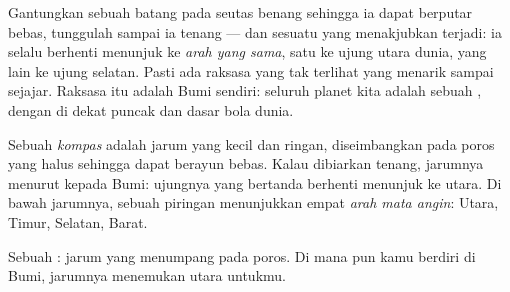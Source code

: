 \begin{example}\label{ex:g4:magnets-and-compass:earth}
Gantungkan sebuah  batang pada seutas benang sehingga ia dapat
berputar bebas, tunggulah sampai ia tenang --- dan sesuatu yang
menakjubkan terjadi: ia selalu berhenti menunjuk ke \emph{arah yang
sama}, satu  ke ujung utara dunia,  yang lain ke ujung
selatan. Pasti ada  raksasa yang tak terlihat yang menarik
 sampai sejajar. Raksasa itu adalah Bumi sendiri: seluruh
planet kita adalah sebuah , dengan   di dekat
puncak dan dasar bola dunia.
\end{example}

\begin{definition}[Kompas]\label{def:g4:magnets-and-compass:compass}
Sebuah \emph{kompas} adalah jarum  yang kecil dan
ringan, diseimbangkan pada poros yang halus sehingga dapat berayun
bebas. Kalau dibiarkan tenang, jarumnya menurut kepada  Bumi:
ujungnya yang bertanda berhenti menunjuk ke utara. Di bawah jarumnya,
sebuah piringan menunjukkan empat
\emph{arah mata angin}: Utara, Timur, Selatan,
Barat.
\end{definition}

\begin{omfigure}

{\small Sebuah : jarum  yang menumpang pada poros. Di mana
pun kamu berdiri di Bumi, jarumnya menemukan utara untukmu.}
\end{omfigure}

